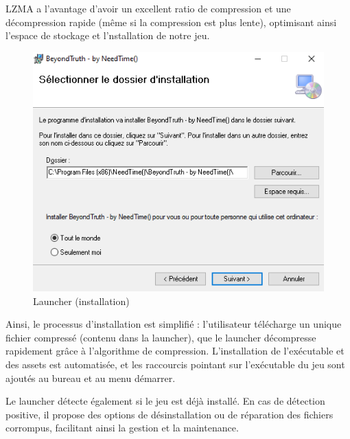 \documentclass[
	article,			%
	11pt,				%
	oneside,			%
	a4paper,			%
	chapter=TITLE,
	french,			%
	sumario=tradicional
	]{base_nt}
\begin{document}
LZMA a l'avantage d'avoir un excellent ratio de compression et une décompression rapide (même si la compression est plus lente), optimisant ainsi l'espace de stockage et l'nstallation de notre jeu.

\newpage

\begin{figure}[ht]
	\caption{Launcher (installation)}
	\centering
	\includegraphics[width=1\linewidth]{paper10.png}
	\legend{}
	
\end{figure}

Ainsi, le processus d'installation est simplifié : l'utilisateur télécharge un unique fichier compressé (contenu dans la launcher), que le launcher décompresse rapidement grâce à l'algorithme de compression. L'installation de l'exécutable et des assets est automatisée, et les raccourcis pointant sur l'exécutable du jeu sont ajoutés au bureau et au menu démarrer.

\newpage

Le launcher détecte également si le jeu est déjà installé. En cas de détection positive, il propose des options de désinstallation ou de réparation des fichiers corrompus, facilitant ainsi la gestion et la maintenance.
\end{document}
